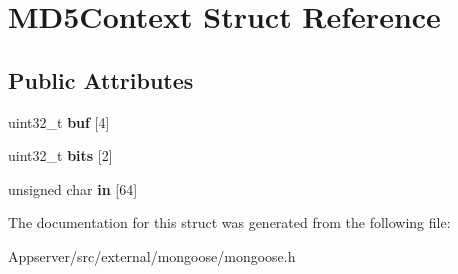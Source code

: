 \hypertarget{structMD5Context}{}\section{M\+D5\+Context Struct Reference}
\label{structMD5Context}
\subsection*{Public Attributes}
\begin{DoxyCompactItemize}
\item 
uint32\+\_\+t {\bfseries buf} \mbox{[}4\mbox{]}\hypertarget{structMD5Context_a6129b10b90387e1cb1d4cd92e4605c33}{}\label{structMD5Context_a6129b10b90387e1cb1d4cd92e4605c33}

\item 
uint32\+\_\+t {\bfseries bits} \mbox{[}2\mbox{]}\hypertarget{structMD5Context_a48f837fb64afd013f832e3cdab68e5de}{}\label{structMD5Context_a48f837fb64afd013f832e3cdab68e5de}

\item 
unsigned char {\bfseries in} \mbox{[}64\mbox{]}\hypertarget{structMD5Context_ae8be45f236e5cb12b0ae79da77e5f929}{}\label{structMD5Context_ae8be45f236e5cb12b0ae79da77e5f929}

\end{DoxyCompactItemize}


The documentation for this struct was generated from the following file\+:\begin{DoxyCompactItemize}
\item 
Appserver/src/external/mongoose/mongoose.\+h\end{DoxyCompactItemize}

